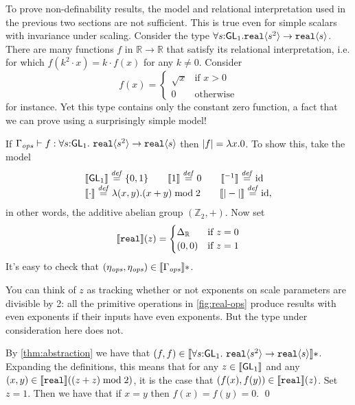 \newcommand{\Grp}{\mathit{Gr}}
To prove non-definability results, the model and relational interpretation
used in the previous two sections are not sufficient.
This is true even for simple scalars with invariance under scaling.
Consider the type 
$\forall s \mathord: \mathsf{GL}_1.\textup{\texttt{real}}\langle s^2 \rangle \to \textup{\texttt{real}}\langle s \rangle$. 
There are many functions $f$ in $\mathbb R \to \mathbb R$
that satisfy its relational interpretation, i.e. for which $f(k^2\cdot x) = k\cdot f(x)$ for 
any $k\neq 0$.
Consider 
\[
f(x) = \begin{cases}\sqrt x & \text{if }x > 0\\0&\text{otherwise}\end{cases}
\]
for instance. Yet this type contains only the constant zero function, a fact that
we can prove using a surprisingly simple model!

\begin{example}
If  $\Gamma_{\mathit{ops}} \vdash f : \forall s \mathord: \mathsf{GL}_1.\
\textup{\texttt{real}}\langle s^2 \rangle \to \textup{\texttt{real}}\langle s \rangle$ 
then $\left| f\right| = \lambda x.0$.
To show this, take the model
\[
\begin{array}{l}
\llbracket \mathsf{GL}_1 \rrbracket \stackrel{\mathit{def}}= \{0,1\}\qquad
\llbracket 1 \rrbracket \stackrel{\mathit{def}}= 0 \qquad
\llbracket {}^{-1} \rrbracket  \stackrel{\mathit{def}}= \mathrm{id}\\
\llbracket \cdot \rrbracket \stackrel{\mathit{def}}= \lambda(x,y).(x+y)\mathrel{\mathrm{mod}} 2
\qquad
\llbracket |-| \rrbracket \stackrel{\mathit{def}}= \mathrm{id},

\end{array}
\]
in other words, the additive abelian group $(\mathbb Z_2, +)$. 
Now set
\[
\llbracket \textup{\texttt{real}} \rrbracket(z) = 
  \begin{cases} \Delta_{\mathbb R} & \text{if }z=0\\
                      {(0,0)} & \text{if }z=1
\end{cases}
\]
It's easy to check that $(\eta_{\mathit{ops}},\eta_{\mathit{ops}})\in\llbracket \Gamma_{\mathit{ops}} \rrbracket*$.

You can think of $z$ as tracking whether or not exponents on scale
parameters are divisible by 2: all the primitive operations in
\autoref{fig:real-ops} produce results with even exponents if their
inputs have even exponents. But the type under consideration here does
not.

By \autoref{thm:abstraction} we have that $(f,f)\in\llbracket \forall s
  \mathord: \mathsf{GL}_1.\ \textup{\texttt{real}}\langle s^2 \rangle \to \textup{\texttt{real}}\langle s \rangle \rrbracket *$.
Expanding the definitions, this means that for any
$z\in\llbracket \mathsf{GL}_1 \rrbracket$ and any
$(x,y)\in\llbracket \textup{\texttt{real}} \rrbracket((z+z)\mathrel\textrm{mod}2)$, it is the case that
$(f(x),f(y))\in\llbracket \textup{\texttt{real}} \rrbracket(z)$. Set $z = 1$.  
Then we have that if $x=y$ then $f(x)=f(y)=0$.
\qed
\end{example}

